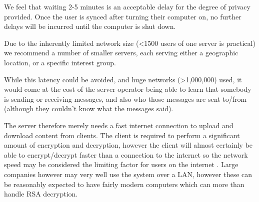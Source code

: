 We feel that waiting 2-5 minutes is an acceptable delay for the degree of privacy
provided. Once the user is synced after turning their computer on, no further
delays will be incurred until the computer is shut down.

Due to the inherently limited network size (\textless1500 users of one server is
practical) we recommend a number of smaller servers, each serving either a
geographic location, or a specific interest group.

While this latency could be avoided, and huge networks (\textgreater1,000,000)
used, it would come at the cost of the server operator being able to learn that
somebody is sending or receiving messages, and also who those messages are sent
to/from (although they couldn't know what the messages said).

The server therefore merely needs a fast internet connection to upload and
download content from clients. The client is required to perform a significant
amount of encryption and decryption, however the client will almost certainly be
able to encrypt/decrypt faster than a connection to the internet so the network
speed may be considered the limiting factor for users on the internet
\cite{cryptoSpeed}. Large companies however may very well use the system over a
LAN, however these can be reasonably expected to have fairly modern computers
which can more than handle RSA decryption.
